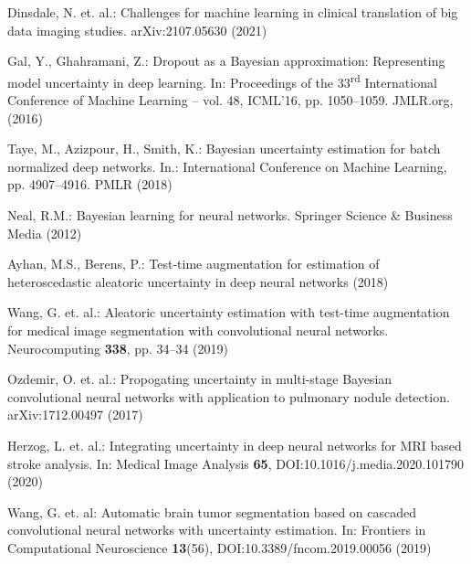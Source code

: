 \documentclass[runningheads]{llncs}
\begin{document}
%
%
%
% 
% 
%
\begin{thebibliography}{8}

Dinsdale, N. et. al.: Challenges for machine learning in clinical translation of big data imaging studies. arXiv:2107.05630 (2021)


Gal, Y., Ghahramani, Z.: Dropout as a Bayesian approximation: Representing model uncertainty in deep learning. In: Proceedings of the 33\textsuperscript{rd} International Conference of Machine Learning -- vol. 48, ICML'16, pp. 1050--1059. JMLR.org, (2016)

Taye, M., Azizpour, H., Smith, K.: Bayesian uncertainty estimation for batch normalized deep networks. In.: International Conference on Machine Learning, pp. 4907--4916. PMLR (2018)

Neal, R.M.: Bayesian learning for neural networks. Springer Science \& Business Media (2012)

Ayhan, M.S., Berens, P.: Test-time augmentation for estimation of heteroscedastic aleatoric uncertainty in deep neural networks (2018)

Wang, G. et. al.: Aleatoric uncertainty estimation with test-time augmentation for medical image segmentation with convolutional neural networks. Neurocomputing \textbf{338}, pp. 34--34 (2019) 

Ozdemir, O. et. al.: Propogating uncertainty in multi-stage Bayesian convolutional neural networks with application to pulmonary nodule detection. arXiv:1712.00497 (2017)

Herzog, L. et. al.: Integrating uncertainty in deep neural networks for MRI based stroke analysis. In: Medical Image Analysis \textbf{65}, DOI:10.1016/j.media.2020.101790 (2020)

Wang, G. et. al: Automatic brain tumor segmentation based on cascaded convolutional neural networks with uncertainty estimation. In: Frontiers in Computational Neuroscience \textbf{13}(56), DOI:10.3389/fncom.2019.00056 (2019)


\end{thebibliography}
\end{document}
